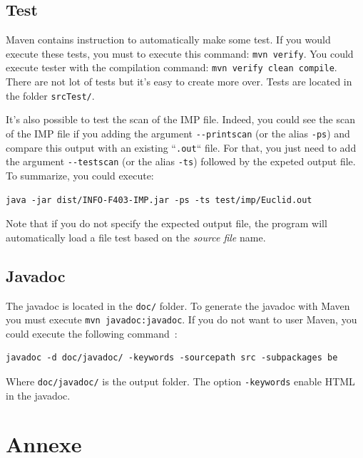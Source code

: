 \documentclass[a4paper,11pt]{article}
\begin{document}
  \subsection{Test}
    Maven contains instruction to automatically make some test.  If you would execute these tests, you must to execute this command: \verb|mvn verify|.  You could execute tester with the compilation command: \verb|mvn verify clean compile|.\\
    There are not lot of tests but it's easy to create more over.  Tests are located in the folder \verb|srcTest/|.
      
    It's also possible to test the scan of the IMP file.  Indeed, you could see the scan of the IMP file if you adding the argument \verb|--printscan| (or the alias \verb|-ps|) and compare this output with an existing ``\verb|.out|`` file.  For that, you just need to add the argument \verb|--testscan| (or the alias \verb|-ts|) followed by the expeted output file.\\
    To summarize, you could execute:
    \begin{verbatim}
java -jar dist/INFO-F403-IMP.jar -ps -ts test/imp/Euclid.out\end{verbatim}
    Note that if you do not specify the expected output file, the program will automatically load a file test based on the \textit{source file} name.
    
  \subsection{Javadoc}
    The javadoc is located in the \verb|doc/| folder. To generate the javadoc with Maven you must execute \verb|mvn javadoc:javadoc|.  If you do not want to user Maven, you could execute the following command~:
    \begin{verbatim}
javadoc -d doc/javadoc/ -keywords -sourcepath src -subpackages be
    \end{verbatim}
    Where \verb|doc/javadoc/| is the output folder. The option \verb|-keywords| enable HTML in the javadoc.

\section{Annexe}
\end{document}
